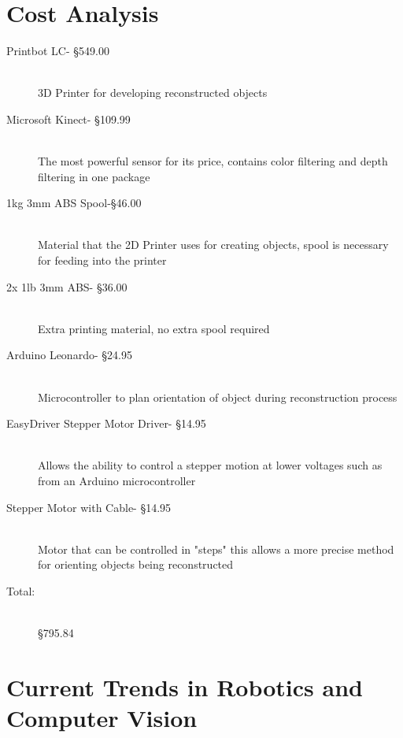 \documentclass[12pt,twocolumn]{article}
\begin{document}
\section{Cost Analysis}
  \begin{description}
  \item[Printbot LC- \S 549.00] \hfill \\
  3D Printer for developing reconstructed objects
  \item[Microsoft Kinect- \S 109.99] \hfill \\
  The most powerful sensor for its price, contains color filtering and depth filtering in one package
  \item[1kg 3mm ABS Spool-\S 46.00] \hfill \\
  Material that the 2D Printer uses for creating objects, spool is necessary for feeding into the printer
  \item[2x 1lb 3mm ABS- \S 36.00] \hfill \\
  Extra printing material, no extra spool required
  \item[Arduino Leonardo-  \S 24.95] \hfill \\
  Microcontroller to plan orientation of object during reconstruction process
  \item[EasyDriver Stepper Motor Driver- \S 14.95] \hfill \\
  Allows the ability to control a stepper motion at lower voltages such as from an Arduino microcontroller
  \item[Stepper Motor with Cable- \S 14.95] \hfill \\
  Motor that can be controlled in "steps" this allows a more precise method for orienting objects being reconstructed
  \item[Total:] \hfill \\
  \S 795.84
  \end{description}

\section{Current Trends in Robotics and Computer Vision}
\end{document}

